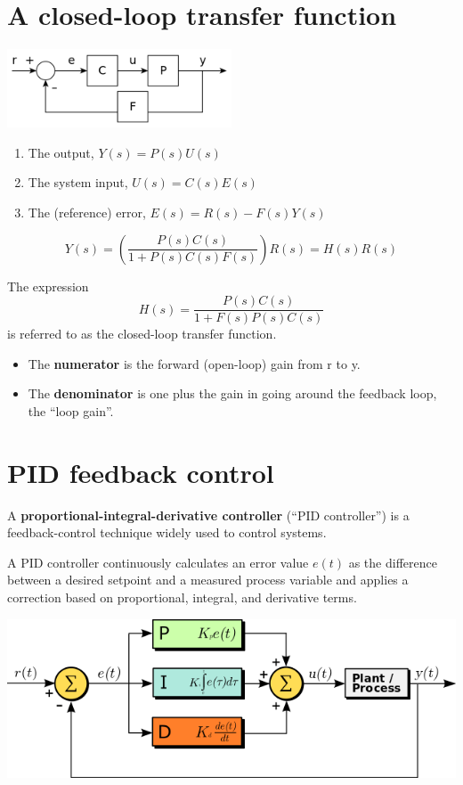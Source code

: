 \documentclass[11pt]{book}
\begin{document}
\section{A closed-loop transfer function}
\begin{center}
	\includegraphics[width = 0.5\textwidth]{figures/16.02.png}
\end{center}

\begin{enumerate}
	\item The output, $Y(s)=P(s)U(s)$
	\item The system input, $U(s)=C(s)E(s)$
	\item The (reference) error, $E(s)=R(s)-F(s)Y(s)$
\end{enumerate}

\begin{equation}
	Y(s)=\left({\frac {P(s)C(s)}{1+P(s)C(s)F(s)}}\right)R(s)=H(s)R(s)
\end{equation}

The expression
\begin{equation}
	H(s)={\frac {P(s)C(s)}{1+F(s)P(s)C(s)}}
\end{equation}
is referred to as the closed-loop transfer function. 
\begin{itemize}
	\item The \textbf{numerator} is the forward (open-loop) gain from r to y.
	\item The \textbf{denominator} is one plus the gain in going around the feedback loop, the ``loop gain''.
\end{itemize}


\section{PID feedback control}
A \textbf{proportional-integral-derivative controller} (``PID controller'') is a feedback-control technique widely used to control systems.

A PID controller continuously calculates an error value $e(t)$ as the difference between a desired setpoint and a measured process variable and applies a correction based on proportional, integral, and derivative terms. 

\begin{center}
	\includegraphics[width = \textwidth]{figures/16.03.png}
\end{center}
\end{document}
